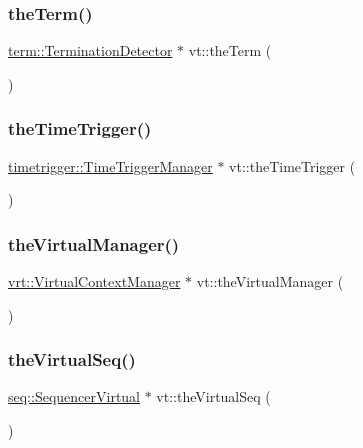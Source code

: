 \mbox{\label{namespacevt_a127580fdfcaba0b4171e5c48c5676733}} 
\subsubsection{\texorpdfstring{the\+Term()}{theTerm()}}
{\footnotesize\ttfamily \hyperlink{structvt_1_1term_1_1_termination_detector}{term\+::\+Termination\+Detector} $\ast$ vt\+::the\+Term (\begin{DoxyParamCaption}{ }\end{DoxyParamCaption})}

\mbox{\label{namespacevt_a1e1a39cdf2a3fc1adefcdfcca4716bf2}} 
\subsubsection{\texorpdfstring{the\+Time\+Trigger()}{theTimeTrigger()}}
{\footnotesize\ttfamily \hyperlink{structvt_1_1timetrigger_1_1_time_trigger_manager}{timetrigger\+::\+Time\+Trigger\+Manager} $\ast$ vt\+::the\+Time\+Trigger (\begin{DoxyParamCaption}{ }\end{DoxyParamCaption})}

\mbox{\label{namespacevt_ad46b232b74b745991314a4a509c648f9}} 
\subsubsection{\texorpdfstring{the\+Virtual\+Manager()}{theVirtualManager()}}
{\footnotesize\ttfamily \hyperlink{structvt_1_1vrt_1_1_virtual_context_manager}{vrt\+::\+Virtual\+Context\+Manager} $\ast$ vt\+::the\+Virtual\+Manager (\begin{DoxyParamCaption}{ }\end{DoxyParamCaption})}

\mbox{\label{namespacevt_abdbb9ddb0d79b35c89e9d742d3fc9d42}} 
\subsubsection{\texorpdfstring{the\+Virtual\+Seq()}{theVirtualSeq()}}
{\footnotesize\ttfamily \hyperlink{structvt_1_1seq_1_1_sequencer_virtual}{seq\+::\+Sequencer\+Virtual} $\ast$ vt\+::the\+Virtual\+Seq (\begin{DoxyParamCaption}{ }\end{DoxyParamCaption})}


